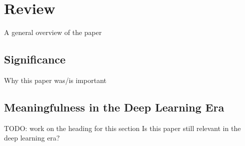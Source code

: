 \section{Review}
\label{sec:review}

A general overview of the paper

\subsection{Significance}

Why this paper was/is important

\subsection{Meaningfulness in the Deep Learning Era}

TODO: work on the heading for this section
Is this paper still relevant in the deep learning era?
